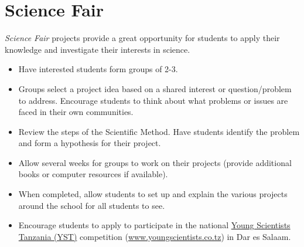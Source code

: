 %

\section{Science Fair} 
\emph{Science Fair} projects provide a great opportunity for students to apply their knowledge and investigate their interests in science.

\begin{itemize}
\item Have interested students form groups of 2-3.
\item Groups select a project idea based on a shared interest or question/problem to address. Encourage students to think about what problems or issues are faced in their own communities. 
\item Review the steps of the Scientific Method. Have students identify the problem and form a hypothesis for their project.
\item Allow several weeks for groups to work on their projects (provide additional books or computer resources if available).
\item When completed, allow students to set up and explain the various projects around the school for all students to see.
\item Encourage students to apply to participate in the national \href{www.youngscientists.co.tz}{Young Scientists Tanzania (YST)} competition (\url{www.youngscientists.co.tz}) in Dar es Salaam.
\end{itemize}

